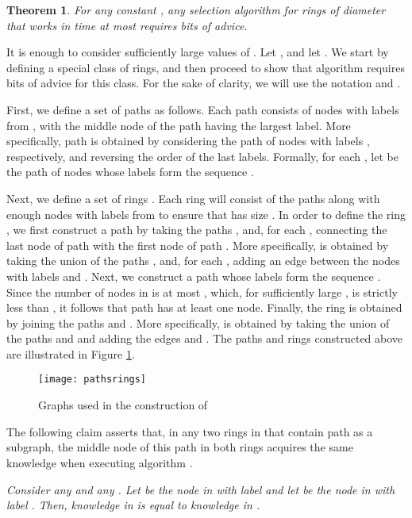 \documentclass[11pt]{article}
\newtheorem{theorem}{Theorem}[section]
\newcommand{\qed}{\hfill  \bigbreak}
\newenvironment{proof}{\noindent {\bf Proof.}}{\qed}
\begin{document}
\begin{theorem}
For any constant ,  any selection algorithm 
for rings of diameter  that works in time at most  requires  bits of advice. 
\end{theorem}
\begin{proof}
It is enough to consider sufficiently large values of .
Let , and let . We start by defining a special class of rings, and then proceed to show that algorithm  requires  bits of advice for this class. For the sake of clarity, we will use the notation  and .

First, we define a set of paths  as follows. Each path consists of  nodes with labels from , with the middle node of the path having the largest label. More specifically, path  is obtained by considering the path of nodes with labels , respectively, and reversing the order of the last  labels. Formally, for each , let  be the path of nodes whose labels form the sequence .

Next, we define a set  of rings . Each ring  will consist of the paths  along with enough nodes with labels from  to ensure that  has size . In order to define the ring , we first construct a path  by taking the paths , and, for each , connecting the last node of path  with the first node of path . More specifically,  is obtained by taking the union of the paths , and, for each , adding an edge between the nodes with labels  and . 
Next, we construct a path  whose labels form the sequence . 
Since the number of nodes in  is at most , which, for sufficiently large , is strictly less than , it follows that path  has at least one node.
Finally, the ring  is obtained by joining the paths  and . More specifically,  is obtained by taking the union of the paths  and  and adding the edges  and . The paths and rings constructed above are illustrated in Figure \ref{pathsrings}.

\begin{figure}[!ht]
\begin{center}
\texttt{[image: pathsrings]}
\end{center}
\caption{Graphs used in the construction of }
\label{pathsrings}
\end{figure}

The following claim asserts that, in any two rings in  that contain path  as a subgraph, the middle node of this path in both rings acquires the same knowledge 
when executing algorithm .


\vspace{3mm} 
\textit{Consider any  and any . Let  be the node in  with label  and let  be the node in  with label . Then, knowledge  in  is equal to knowledge  in .}
\vspace{3mm}


\end{proof}
\end{document}
